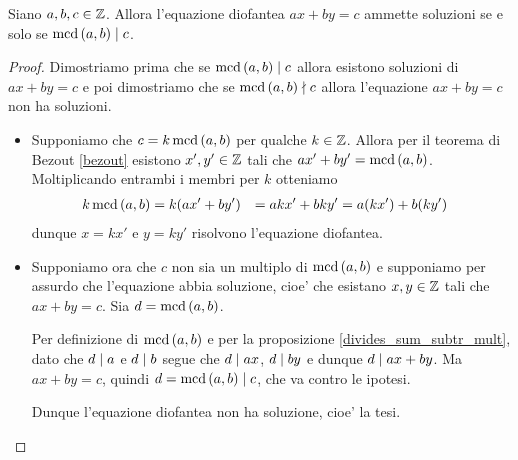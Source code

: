 \begin{theorem}
    Siano $a, b, c \in \mathbb{Z}$. Allora l'equazione diofantea $ax + by = c$ ammette soluzioni se e solo se $\operatorname{mcd}\left(a, b\right) \mid c$.
\end{theorem}
\begin{proof}
    Dimostriamo prima che se $\operatorname{mcd}\left(a, b\right) \mid c$ allora esistono soluzioni di $ax + by = c$ e poi dimostriamo che se $\operatorname{mcd}\left(a, b\right) \nmid c$ allora l'equazione $ax + by = c$ non ha soluzioni.
    \begin{itemize}
        \item Supponiamo che $c = k\operatorname{mcd}\left(a, b\right)$ per qualche $k \in \mathbb{Z}$. Allora per il teorema di Bezout \ref{bezout} esistono $x', y' \in \mathbb{Z}$ tali che $ax' + by' = \operatorname{mcd}\left(a, b\right)$. Moltiplicando  entrambi i membri per $k$ otteniamo
        \begin{alignat*}{2} 
            k\operatorname{mcd}\left(a, b\right) &= k(ax' + by')
                        &= akx' + bky'
                        &= a(kx') + b(ky')
        \end{alignat*}
        dunque $x = kx'$ e $y = ky'$ risolvono l'equazione diofantea.
        \item Supponiamo ora che $c$ non sia un multiplo di $\operatorname{mcd}\left(a, b\right)$ e supponiamo per assurdo che l'equazione abbia soluzione, cioe' che esistano $x, y \in \mathbb{Z}$ tali che $ax + by = c$. Sia $d = \operatorname{mcd}\left(a, b\right)$.
        
        Per definizione di $\operatorname{mcd}\left(a, b\right)$ e per la proposizione \ref{divides_sum_subtr_mult}, dato che $d \mid a$ e $d \mid b$ segue che $d \mid ax$, $d \mid by$ e dunque $d \mid ax + by$. Ma $ax + by = c$, quindi $d = \operatorname{mcd}\left(a, b\right) \mid c$, che va contro le ipotesi.

        Dunque l'equazione diofantea non ha soluzione, cioe' la tesi. \qedhere
    \end{itemize}
\end{proof}

